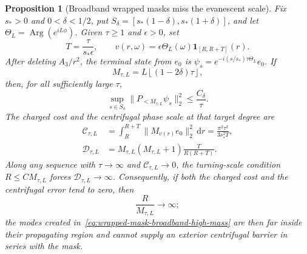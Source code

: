 \documentclass[11pt]{article}
\newcommand{\dd}{\,\mathrm d}
\newtheorem{proposition}[theorem]{Proposition}
\theoremstyle{definition}
\theoremstyle{remark}
\begin{document}
\begin{proposition}[Broadband wrapped masks miss the evanescent scale]
\label{prop:wrapped-mask-evanescent-scale-no-go}
Fix $s_*>0$ and $0<\delta<1/2$, put
$S_\delta=[s_*(1-\delta),s_*(1+\delta)]$, and let
$\Theta_L=\operatorname{Arg}(e^{iL\phi})$.  Given $\tau\geq1$ and
$\epsilon>0$, set
\begin{equation}
 T=\frac{\tau}{s_*\epsilon},
 \qquad
 v(r,\omega)=\epsilon\Theta_L(\omega)
       \mathbf1_{[R,R+T]}(r).
 \label{eq:large-area-wrapped-mask}
\end{equation}
After deleting $A_3/r^2$, the terminal state from $e_0$ is
$\psi_s=e^{-i(s/s_*)\tau\Theta_L}e_0$.  If
\begin{equation}
 M_{\tau,L}=L\left\lfloor(1-2\delta)\tau\right\rfloor,
 \label{eq:wrapped-mask-target-degree}
\end{equation}
then, for all sufficiently large $\tau$,
\begin{equation}
 \sup_{s\in S_\delta}
 \|P_{<M_{\tau,L}}\psi_s\|_2^2
 \leq\frac{C_\delta}{\tau}.
 \label{eq:wrapped-mask-broadband-high-mass}
\end{equation}
The charged cost and the centrifugal phase scale at that target degree are
\begin{align}
 \mathcal C_{\tau,L}
 &=\int_R^{R+T}\|M_{v(r)}e_0\|_2^2\dd r
 =\frac{\pi^2\tau^2}{3s_*^2T},
 \label{eq:large-area-wrapped-cost}\\
 \mathcal D_{\tau,L}
 &=M_{\tau,L}(M_{\tau,L}+1)
   \frac{T}{R(R+T)}.
 \label{eq:large-area-wrapped-transport}
\end{align}
Along any sequence with $\tau\to\infty$ and
$\mathcal C_{\tau,L}\to0$, the turning-scale condition
$R\leq C M_{\tau,L}$ forces
$\mathcal D_{\tau,L}\to\infty$.  Consequently, if both the charged cost and
the centrifugal error tend to zero, then
\begin{equation}
 \frac{R}{M_{\tau,L}}\longrightarrow\infty;
 \label{eq:wrapped-mask-far-propagating}
\end{equation}
the modes created in~\eqref{eq:wrapped-mask-broadband-high-mass} are then far
inside their propagating region and cannot supply an exterior centrifugal
barrier in series with the mask.
\end{proposition}
\end{document}
